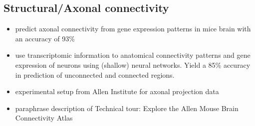 \documentclass[]{article}
\renewcommand{\cite}{\citep}
\begin{document}
\subsection*{Structural/Axonal connectivity}

\begin{itemize}
	\item \cite{fakhry2015high} predict axonal connectivity from gene expression patterns in mice brain with an accuracy of 93\%
	\item \cite{roberti2019exploiting} use transcriptomic information to anatomical connectivity patterns and gene expression of neurons using (shallow) neural networks. Yield a 85\% accuracy in prediction of unconnected and connected regions.
	
\end{itemize}

\begin{itemize}
	\item experimental setup from Allen Institute for axonal projection data
	\item paraphrase description of \glqq Technical tour: Explore the Allen Mouse Brain Connectivity Atlas\grqq{}
\end{itemize}
\end{document}
